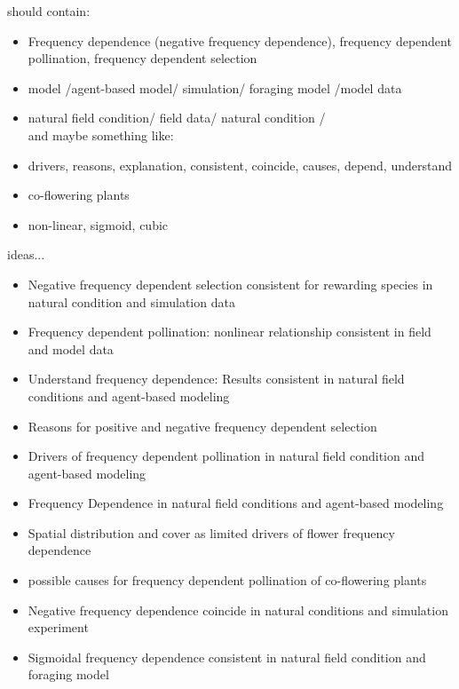 \documentclass{article}
\begin{document}
should contain:
\begin{itemize}
\item Frequency dependence (negative frequency dependence), frequency dependent pollination, frequency dependent selection
\item model /agent-based model/ simulation/ foraging model /model data
\item natural field condition/ field data/ natural condition / \\

and maybe something like:
\item drivers, reasons, explanation, consistent, coincide, causes, depend, understand
\item co-flowering plants
\item non-linear, sigmoid, cubic
\end{itemize}

ideas...
\begin{itemize}

\item Negative frequency dependent selection consistent for rewarding species in natural condition and simulation data

\item Frequency dependent pollination: nonlinear relationship consistent in field and model data

\item Understand frequency dependence: Results consistent in natural field conditions and agent-based modeling

\item  Reasons for positive and negative frequency dependent selection

\item Drivers of frequency dependent pollination in natural field condition and agent-based modeling

\item Frequency Dependence in natural field conditions and agent-based modeling

\item Spatial distribution and cover as limited drivers of flower frequency dependence

\item  possible causes for frequency dependent pollination of co-flowering plants 

\item  Negative frequency dependence coincide in natural conditions and simulation experiment

\item  Sigmoidal frequency dependence consistent in natural field condition and foraging model

\end{itemize}
\end{document}
